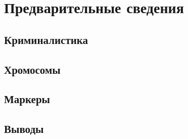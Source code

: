 \chapter{Предварительные сведения}
\section{Криминалистика}
\section{Хромосомы}
\section{Маркеры}
\section{Выводы}
